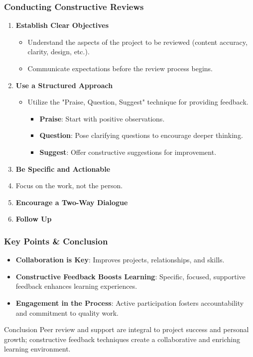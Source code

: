 \documentclass[aspectratio=169]{beamer}
\begin{document}
\begin{frame}[fragile]
    \frametitle{Conducting Constructive Reviews}
    \begin{enumerate}
        \item \textbf{Establish Clear Objectives}
            \begin{itemize}
                \item Understand the aspects of the project to be reviewed (content accuracy, clarity, design, etc.).
                \item Communicate expectations before the review process begins.
            \end{itemize}
        \item \textbf{Use a Structured Approach}
            \begin{itemize}
                \item Utilize the "Praise, Question, Suggest" technique for providing feedback.
                \begin{itemize}
                    \item \textbf{Praise}: Start with positive observations.
                    \item \textbf{Question}: Pose clarifying questions to encourage deeper thinking.
                    \item \textbf{Suggest}: Offer constructive suggestions for improvement.
                \end{itemize}
            \end{itemize}
        \item \textbf{Be Specific and Actionable}
            \item Focus on the work, not the person.
        \item \textbf{Encourage a Two-Way Dialogue}
        \item \textbf{Follow Up}
    \end{enumerate}
\end{frame}

\begin{frame}[fragile]
    \frametitle{Key Points & Conclusion}
    \begin{itemize}
        \item \textbf{Collaboration is Key}: Improves projects, relationships, and skills.
        \item \textbf{Constructive Feedback Boosts Learning}: Specific, focused, supportive feedback enhances learning experiences.
        \item \textbf{Engagement in the Process}: Active participation fosters accountability and commitment to quality work.
    \end{itemize}
    \begin{block}{Conclusion}
        Peer review and support are integral to project success and personal growth; constructive feedback techniques create a collaborative and enriching learning environment.
    \end{block}
\end{frame}
\end{document}
